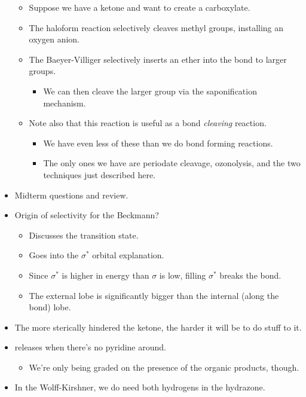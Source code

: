 \documentclass[../notes.tex]{subfiles}
\begin{document}
\begin{itemize}
\begin{itemize}
        \item Suppose we have a ketone and want to create a carboxylate.
        \item The haloform reaction selectively cleaves methyl groups, installing an oxygen anion.
        \item The Baeyer-Villiger selectively inserts an ether into the bond to larger groups.
        \begin{itemize}
            \item We can then cleave the larger group via the saponification mechanism.
        \end{itemize}
        \item Note also that this reaction is useful as a  bond \emph{cleaving} reaction.
        \begin{itemize}
            \item We have even less of these than we do  bond forming reactions.
            \item The only ones we have are periodate cleavage, ozonolysis, and the two techniques just described here.
        \end{itemize}
    \end{itemize}
    \item Midterm questions and review.
    \item Origin of selectivity for the Beckmann?
    \begin{itemize}
        \item Discusses the transition state.
        \item Goes into the $\sigma^*$ orbital explanation.
        \item Since $\sigma^*$ is higher in energy than $\sigma$ is low, filling $\sigma^*$ breaks the bond.
        \item The external lobe is significantly bigger than the internal (along the bond) lobe.
    \end{itemize}
    \item The more sterically hindered the ketone, the harder it will be to do stuff to it.
    \item {} releases  when there's no pyridine around.
    \begin{itemize}
        \item We're only being graded on the presence of the organic products, though.
    \end{itemize}
    \item In the Wolff-Kirshner, we do need both hydrogens in the hydrazone.

\end{itemize}
\end{document}
